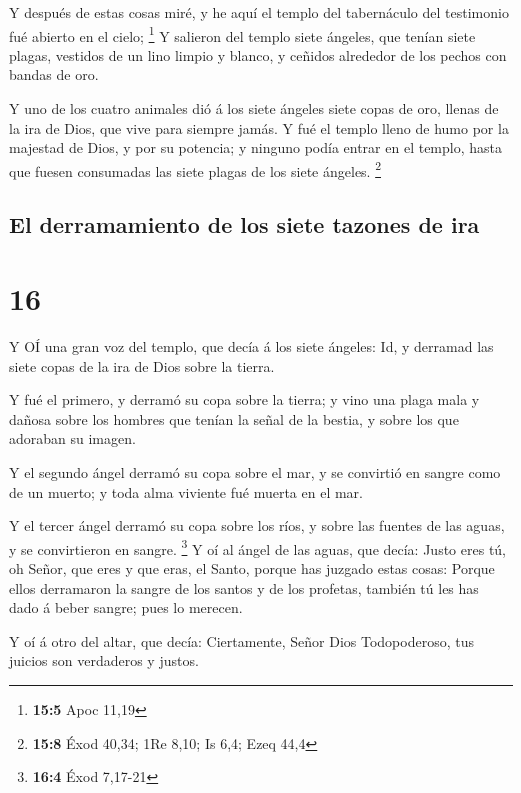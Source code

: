  Y después de estas cosas miré, y he aquí el templo del
tabernáculo del testimonio fué abierto en el cielo; \footnote{\textbf{15:5}
  Apoc 11,19}  Y salieron del templo siete ángeles, que
tenían siete plagas, vestidos de un lino limpio y blanco, y ceñidos
alrededor de los pechos con bandas de oro.

 Y uno de los cuatro animales dió á los siete ángeles siete
copas de oro, llenas de la ira de Dios, que vive para siempre jamás.
 Y fué el templo lleno de humo por la majestad de Dios, y
por su potencia; y ninguno podía entrar en el templo, hasta que fuesen
consumadas las siete plagas de los siete ángeles. \footnote{\textbf{15:8}
  Éxod 40,34; 1Re 8,10; Is 6,4; Ezeq 44,4}

\hypertarget{el-derramamiento-de-los-siete-tazones-de-ira}{%
\subsection{El derramamiento de los siete tazones de
ira}\label{el-derramamiento-de-los-siete-tazones-de-ira}}

\hypertarget{section-15}{%
\section{16}\label{section-15}}

 Y OÍ una gran voz del templo, que decía á los siete
ángeles: Id, y derramad las siete copas de la ira de Dios sobre la
tierra.

 Y fué el primero, y derramó su copa sobre la tierra; y vino
una plaga mala y dañosa sobre los hombres que tenían la señal de la
bestia, y sobre los que adoraban su imagen.

 Y el segundo ángel derramó su copa sobre el mar, y se
convirtió en sangre como de un muerto; y toda alma viviente fué muerta
en el mar.

 Y el tercer ángel derramó su copa sobre los ríos, y sobre
las fuentes de las aguas, y se convirtieron en sangre. \footnote{\textbf{16:4}
  Éxod 7,17-21}  Y oí al ángel de las aguas, que decía:
Justo eres tú, oh Señor, que eres y que eras, el Santo, porque has
juzgado estas cosas:  Porque ellos derramaron la sangre de
los santos y de los profetas, también tú les has dado á beber sangre;
pues lo merecen.

 Y oí á otro del altar, que decía: Ciertamente, Señor Dios
Todopoderoso, tus juicios son verdaderos y justos.

